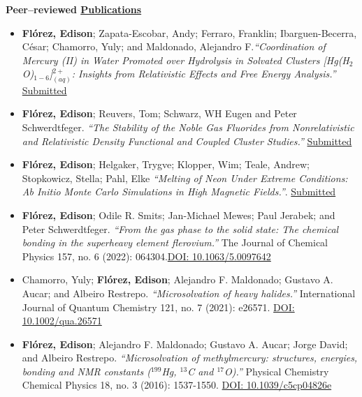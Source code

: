 {\bf\Large Peer--reviewed \href{.}{Publications}}

\begin{itemize}
    \small

    \item \textbf{Flórez, Edison}; Zapata-Escobar, Andy; Ferraro, Franklin; Ibarguen-Becerra, César; Chamorro, Yuly; and Maldonado, Alejandro F.\emph{``Coordination of Mercury (II) in Water Promoted over Hydrolysis in Solvated Clusters [Hg(H$_2$O)$_{1-6}$]$^{2+}_{(aq)}$: Insights from Relativistic Effects and Free Energy Analysis.''} \underline{Submitted}

    \item \textbf{Flórez, Edison}; Reuvers, Tom; Schwarz, WH Eugen and Peter Schwerdtfeger. \emph{``The Stability of the Noble Gas Fluorides from Nonrelativistic and Relativistic Density Functional and Coupled Cluster Studies.''} \underline{Submitted}

    \item \textbf{Flórez, Edison}; Helgaker, Trygve; Klopper, Wim; Teale, Andrew; Stopkowicz, Stella; Pahl, Elke \emph{``Melting of Neon Under Extreme Conditions: Ab Initio Monte Carlo Simulations in High Magnetic Fields.''}. \underline{Submitted}

    \item \textbf{Flórez, Edison}; Odile R. Smits; Jan-Michael Mewes; Paul Jerabek; and Peter Schwerdtfeger. \emph{``From the gas phase to the solid state: The chemical bonding in the superheavy element flerovium.''} The Journal of Chemical Physics 157, no. 6 (2022): 064304.\underline{DOI: 10.1063/5.0097642}

    \item Chamorro, Yuly;  \textbf{Flórez, Edison}; Alejandro F. Maldonado; Gustavo A. Aucar; and Albeiro Restrepo. \emph{``Microsolvation of heavy halides.''} International Journal of Quantum Chemistry 121, no. 7 (2021): e26571. \underline{DOI: 10.1002/qua.26571}

    \item \textbf{Flórez, Edison}; Alejandro F. Maldonado; Gustavo A. Aucar; Jorge David; and Albeiro Restrepo. \emph{``Microsolvation of methylmercury: structures, energies, bonding and NMR constants ($^{199}$Hg, $^{13}$C and $^{17}$O).''} Physical Chemistry Chemical Physics 18, no. 3 (2016): 1537-1550. \underline{DOI: 10.1039/c5cp04826e}

\end{itemize}


